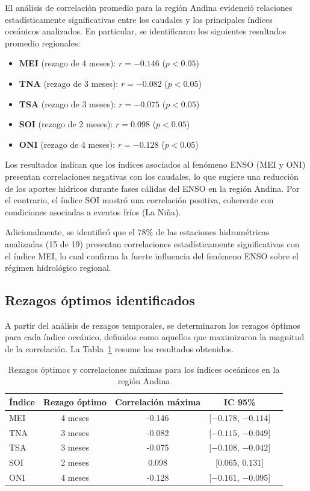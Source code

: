 El análisis de correlación promedio para la región Andina evidenció relaciones estadísticamente significativas entre los caudales y los principales índices oceánicos analizados. En particular, se identificaron los siguientes resultados promedio regionales:

\begin{itemize}
    \item \textbf{MEI} (rezago de 4 meses): $r = -0.146$ ($p < 0.05$)
    \item \textbf{TNA} (rezago de 3 meses): $r = -0.082$ ($p < 0.05$)
    \item \textbf{TSA} (rezago de 3 meses): $r = -0.075$ ($p < 0.05$)
    \item \textbf{SOI} (rezago de 2 meses): $r = 0.098$ ($p < 0.05$)
    \item \textbf{ONI} (rezago de 4 meses): $r = -0.128$ ($p < 0.05$)
\end{itemize}

Los resultados indican que los índices asociados al fenómeno ENSO (MEI y ONI) presentan correlaciones negativas con los caudales, lo que sugiere una reducción de los aportes hídricos durante fases cálidas del ENSO en la región Andina. Por el contrario, el índice SOI mostró una correlación positiva, coherente con condiciones asociadas a eventos fríos (La Niña).

Adicionalmente, se identificó que el 78\% de las estaciones hidrométricas analizadas (15 de 19) presentan correlaciones estadísticamente significativas con el índice MEI, lo cual confirma la fuerte influencia del fenómeno ENSO sobre el régimen hidrológico regional.

\subsection{Rezagos óptimos identificados}

A partir del análisis de rezagos temporales, se determinaron los rezagos óptimos para cada índice oceánico, definidos como aquellos que maximizaron la magnitud de la correlación. La Tabla~\ref{tab:rezagos_optimos} resume los resultados obtenidos.

\begin{table}[H]
\centering
\caption{Rezagos óptimos y correlaciones máximas para los índices oceánicos en la región Andina}
\label{tab:rezagos_optimos}
\begin{tabular}{lcccc}
\hline
\textbf{Índice} & \textbf{Rezago óptimo} & \textbf{Correlación máxima} & \textbf{IC 95\%} \\
\hline
MEI & 4 meses & -0.146 & [$-0.178$, $-0.114$] \\
TNA & 3 meses & -0.082 & [$-0.115$, $-0.049$] \\
TSA & 3 meses & -0.075 & [$-0.108$, $-0.042$] \\
SOI & 2 meses & 0.098 & [$0.065$, $0.131$] \\
ONI & 4 meses & -0.128 & [$-0.161$, $-0.095$] \\
\hline
\end{tabular}
\end{table}

